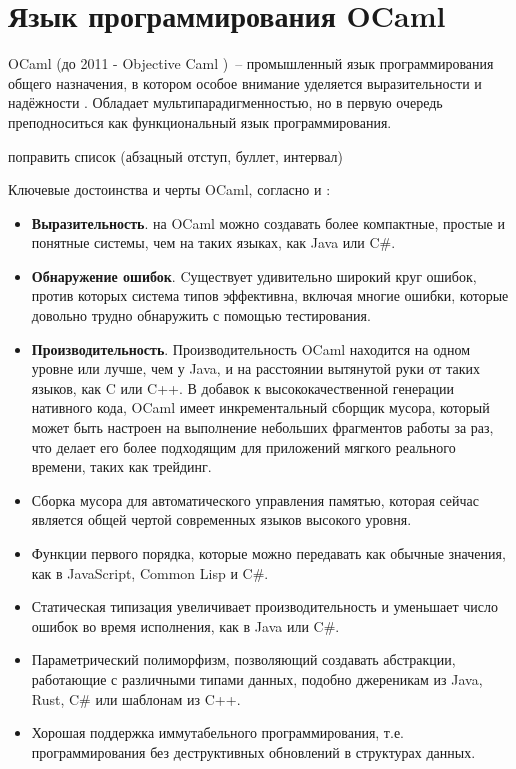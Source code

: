 \section{Язык программирования OCaml}

OCaml (до 2011 - Objective Caml \cite{camlhistory})~-- промышленный язык программирования общего назначения,
в котором особое внимание уделяется выразительности и надёжности \cite{ocamlorg}. Обладает
мультипарадигменностью, но в первую очередь преподноситься как функциональный язык программирования.

\TODO поправить список (абзацный отступ, буллет, интервал) \TODO

Ключевые достоинства и черты OCaml, согласно \cite[c.~3]{yaron2011} и \cite{rwo-prologue}:

\begin{itemize}
    \item \textbf{Выразительность}. на OCaml можно создавать более компактные, простые и понятные системы,
          чем на таких языках, как Java или C\#.
    \item \textbf{Обнаружение ошибок}. Cуществует удивительно
          широкий круг ошибок, против которых система типов эффективна, включая многие ошибки, которые довольно трудно
          обнаружить с помощью тестирования.
    \item \textbf{Производительность}. Производительность OCaml находится на одном уровне или лучше,
          чем у Java, и на расстоянии вытянутой руки от таких языков, как C или C++. В добавок к высококачественной генерации нативного кода,
          OCaml имеет инкрементальный сборщик мусора, который может быть настроен на выполнение небольших
          фрагментов работы за раз, что делает его более подходящим для приложений мягкого реального времени,
          таких как трейдинг.
    \item Сборка мусора для автоматического управления памятью, которая сейчас является общей чертой современных языков высокого уровня.
    \item Функции первого порядка, которые можно передавать как обычные значения, как в JavaScript, Common Lisp и C\#.
    \item Статическая типизация увеличивает производительность и уменьшает число ошибок во время исполнения, как в Java или C\#.
    \item Параметрический полиморфизм, позволяющий создавать абстракции, работающие с различными типами данных,
          подобно джереникам из Java, Rust, C\# или шаблонам из C++.
    \item Хорошая поддержка иммутабельного программирования, т.е. программирования без деструктивных обновлений в структурах данных.

\end{itemize}
